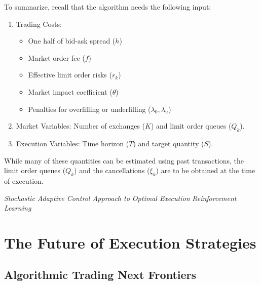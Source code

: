 To summarize, recall that the algorithm needs the following input:
	\begin{enumerate}[--]
	\item Trading Costs: 
		\begin{itemize}
		\item One half of bid-ask spread ($h$)
		\item Market order fee ($f$)
		\item Effective limit order risks ($r_k$)
		\item Market impact coefficient ($\theta$)
		\item Penalties for overfilling or underfilling ($\lambda_0,\lambda_u$)
		\end{itemize}
	\item Market Variables: Number of exchanges ($K$) and limit order queues ($Q_k$).
	\item Execution Variables: Time horizon ($T$) and target quantity ($S$).
	\end{enumerate}
While many of these quantities can be estimated using past transactions, the limit order queues ($Q_k$) and the cancellations ($\xi_k$) are to be obtained at the time of execution.




\noindent\emph{Stochastic Adaptive Control Approach to Optimal Execution}
\noindent\emph{Reinforcement Learning}
\section{The Future of Execution Strategies}
\subsection{Algorithmic Trading Next Frontiers}